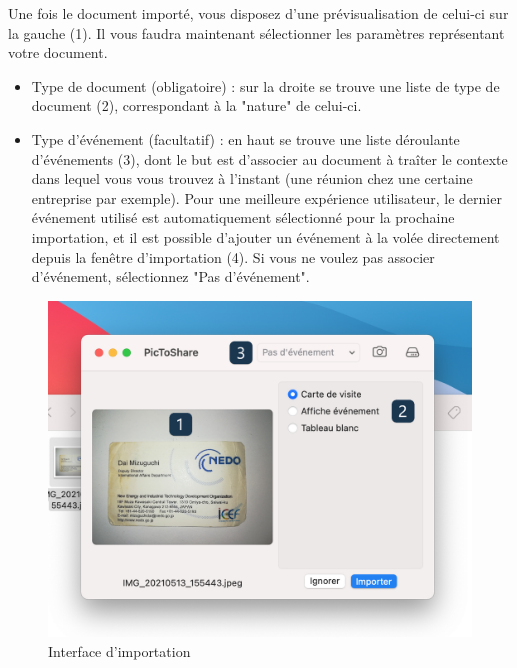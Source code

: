 \documentclass[a4paper,11pt]{article}
\begin{document}
	Une fois le document importé, vous disposez d'une prévisualisation de celui-ci sur la gauche (1). Il vous faudra maintenant sélectionner les paramètres représentant votre document. 
	
	\begin{itemize}
	
		\item Type de document (obligatoire) : sur la droite se trouve une liste de type de document (2), correspondant à la "nature" de celui-ci. 
		\item Type d'événement (facultatif) : en haut se trouve une liste déroulante d'événements (3), dont le but est d'associer au document à traîter le contexte dans lequel vous vous trouvez à l'instant (une réunion chez une certaine entreprise par exemple). Pour une meilleure expérience utilisateur, le dernier événement utilisé est automatiquement sélectionné pour la prochaine importation, et il est possible d'ajouter un événement à la volée directement depuis la fenêtre d'importation (4). Si vous ne voulez pas associer d'événement, sélectionnez "Pas d'événement".
	
	\end{itemize}
	
	\begin{figure}[h]
		\centering
		\includegraphics[width=12cm]{Importation_standby}
		\caption{Interface d'importation}
	\end{figure}
	
\end{document}
